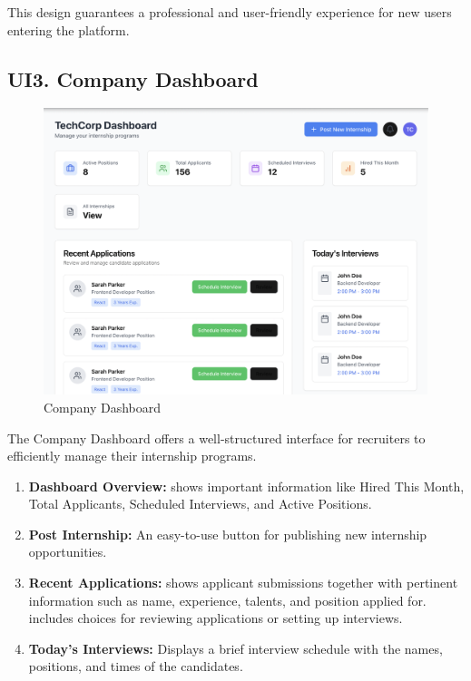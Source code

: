 This design guarantees a professional and user-friendly experience for new users entering the platform.

\subsection{UI3. Company Dashboard}
\label{subsec:company_dashboard_ui}%

\begin{figure}[H]
    \begin{center}
        \includegraphics[width=0.82\linewidth]{JhaBhatiaSharma/imagesDD/CompanyDashboard.png}
        \caption{Company Dashboard}
        \label{fig:companyDashboard}
    \end{center}
\end{figure}

The Company Dashboard offers a well-structured interface for recruiters to efficiently manage their internship programs.

\begin{enumerate}
    \item \textbf{Dashboard Overview:} shows important information like Hired This Month, Total Applicants, Scheduled Interviews, and Active Positions.
    \item \textbf{Post Internship:} An easy-to-use button for publishing new internship opportunities.
    \item \textbf{Recent Applications:} shows applicant submissions together with pertinent information such as name, experience, talents, and position applied for. includes choices for reviewing applications or setting up interviews.
    \item \textbf{Today's Interviews:} Displays a brief interview schedule with the names, positions, and times of the candidates.
\end{enumerate}

